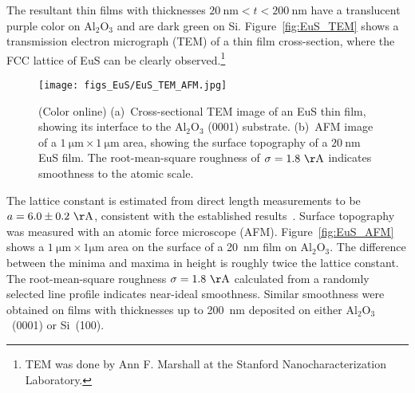 The resultant thin films with thicknesses $20~\mathrm{nm}<t<200~\mathrm{nm}$ have a translucent purple color on Al$_2$O$_3$ and are dark green on Si. Figure~\ref{fig:EuS_TEM} shows a transmission electron micrograph (TEM) of a thin film cross-section, where the FCC lattice of EuS can be clearly observed.\footnote{TEM was done by Ann F. Marshall at the Stanford Nanocharacterization Laboratory.} %
%
\begin{figure}[ht]%
    \subfloat{\label{fig:EuS_TEM}}%
    \subfloat{\label{fig:EuS_AFM}}%
    \centering%
    \texttt{[image: figs\_EuS/EuS\_TEM\_AFM.jpg]}%
    \caption[Cross-section and surface micrographs of an EuS thin film]{\label{fig:EuS_TEM_AFM}(Color online) (a)~Cross-sectional TEM image of an EuS thin film, showing its interface to the Al$_2$O$_3$ (0001) substrate. (b)~AFM image of a $1~\mathrm{\mu{}m}\times{}1~\mathrm{\mu{}m}$ area, showing the surface topography of a $20~\mathrm{nm}$ EuS film. The root-mean-square roughness of $\sigma=1.8~\mathrm\AA$ indicates smoothness to the atomic scale.}%
\end{figure}%
%
The lattice constant is estimated from direct length measurements to be $a=6.0\pm0.2~\mathrm\AA$, consistent with the established results~\cite{EuS_Shafer}. Surface topography was measured with an atomic force microscope (AFM). Figure~\ref{fig:EuS_AFM} shows a $1~\mathrm{\mu{}m}\times{}1\mathrm{\mu{}m}$ area on the surface of a 20~nm film on Al$_2$O$_3$. The difference between the minima and maxima in height is roughly twice the lattice constant. The root-mean-square roughness $\sigma=1.8~\mathrm\AA$ calculated from a randomly selected line profile indicates near-ideal smoothness. Similar smoothness were obtained on films with thicknesses up to 200~nm deposited on either Al$_2$O$_3$~(0001) or Si~(100).

